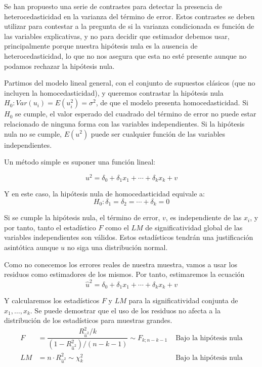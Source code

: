

Se han propuesto una serie de contrastes para detectar la presencia de heterocedasticidad en la varianza del t\'ermino de error. Estos contrastes se deben utilizar para contestar a la pregunta de si la varianza condicionada es funci\'on de las variables explicativas, y no para decidir que estimador debemos usar, principalmente porque nuestra hip\'otesis nula es la ausencia de heterocedasticidad, lo que no nos asegura que esta no est\'e presente aunque no podamos rechazar la hip\'otesis nula.


Partimos del modelo lineal general, con el conjunto de supuestos cl\'asicos (que no incluyen la homocedasticidad), y queremos contrastar la hip\'otesis nula $H_0:Var(u_i)=E(u_i^2)=\sigma^2$, de que el modelo presenta homocedasticidad. Si $H_0$ se cumple, el valor esperado del cuadrado del t\'ermino de error no puede estar relacionado de ninguna forma con las variables independientes. Si la hip\'otesis nula no se cumple, $E(u^2)$ puede ser cualquier funci\'on de las variables independientes.

Un m\'etodo simple es suponer una funci\'on lineal:

\[u^2=\delta_0+\delta_1x_1+\cdots+\delta_kx_k+v\]

Y en este caso, la hip\'otesis nula de homocedasticidad equivale a:
\[H_0:\delta_1=\delta_2=\cdots+\delta_k=0\]

Si se cumple la hip\'otesis nula, el t\'ermino de error, $v$, es independiente de las $x_i$, y por tanto, tanto el estad\'istico $F$ como el $LM$ de significatividad global de las variables independientes son v\'alidos. Estos estad\'isticos tendr\'an una justificaci\'on asint\'otica aunque $u$ no siga una distribuci\'on normal.

Como no conecemos los errores reales de nuestra muestra, vamos a usar los residuos como estimadores de los mismos. Por tanto, estimaremos la ecuaci\'on
\[\hat{u}^2=\delta_0+\delta_1x_1+\cdots+\delta_kx_k+v\]

Y calcularemos los estad\'isticos $F$ y $LM$ para la significatividad conjunta de $x_1,\ldots,x_k$. Se puede demostrar que el uso de los residuos no afecta a la distribuci\'on de los estad\'isticos para muestras grandes.
\begin{align*}
F&=\dfrac{R^2_{\hat{u}^2}/k}{(1-R^2_{\hat{u}^2})/(n-k-1)}\sim F_{k;n-k-1}& \text{ Bajo la hip\'otesis nula}\\
LM&=n\cdot R^2_{\hat{u}^2}\sim\chi^2_{k}& \text{ Bajo la hip\'otesis nula}
\end{align*}

